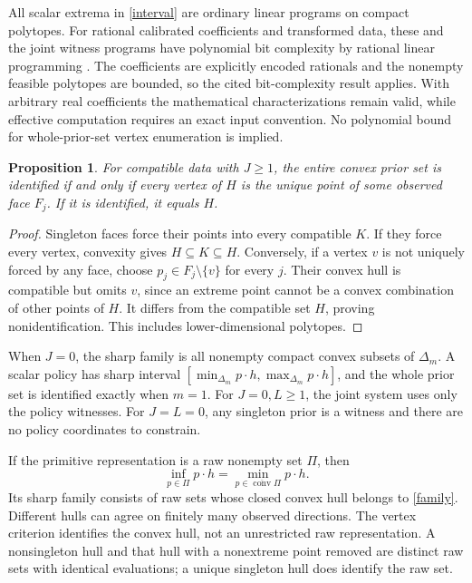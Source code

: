 \documentclass[11pt]{article}
\newtheorem{proposition}{Proposition}
\newcommand{\conv}{\operatorname{conv}}
\begin{document}
All scalar extrema in \eqref{interval} are ordinary linear programs on compact polytopes. For rational calibrated coefficients and transformed data, these and the joint witness programs have polynomial bit complexity by rational linear programming \cite[Section 8.4.2]{BenTalNemirovski}. The coefficients are explicitly encoded rationals and the nonempty feasible polytopes are bounded, so the cited bit-complexity result applies. With arbitrary real coefficients the mathematical characterizations remain valid, while effective computation requires an exact input convention. No polynomial bound for whole-prior-set vertex enumeration is implied.

\begin{proposition}\label{vertices}
For compatible data with $J\ge1$, the entire convex prior set is identified if and only if every vertex of $H$ is the unique point of some observed face $F_j$. If it is identified, it equals $H$.
\end{proposition}
\begin{proof}
Singleton faces force their points into every compatible $K$. If they force every vertex, convexity gives $H\subseteq K\subseteq H$. Conversely, if a vertex $v$ is not uniquely forced by any face, choose $p_j\in F_j\setminus\{v\}$ for every $j$. Their convex hull is compatible but omits $v$, since an extreme point cannot be a convex combination of other points of $H$. It differs from the compatible set $H$, proving nonidentification. This includes lower-dimensional polytopes.
\end{proof}

When $J=0$, the sharp family is all nonempty compact convex subsets of $\Delta_m$. A scalar policy has sharp interval $[\min_{\Delta_m}p\cdot h,\max_{\Delta_m}p\cdot h]$, and the whole prior set is identified exactly when $m=1$. For $J=0,L\ge1$, the joint system uses only the policy witnesses. For $J=L=0$, any singleton prior is a witness and there are no policy coordinates to constrain.

If the primitive representation is a raw nonempty set $\Pi$, then
\[
 \inf_{p\in\Pi}p\cdot h
       =\min_{p\in\overline{\conv}\Pi}p\cdot h.
\]
Its sharp family consists of raw sets whose closed convex hull belongs to \eqref{family}. Different hulls can agree on finitely many observed directions. The vertex criterion identifies the convex hull, not an unrestricted raw representation. A nonsingleton hull and that hull with a nonextreme point removed are distinct raw sets with identical evaluations; a unique singleton hull does identify the raw set.
\end{document}
